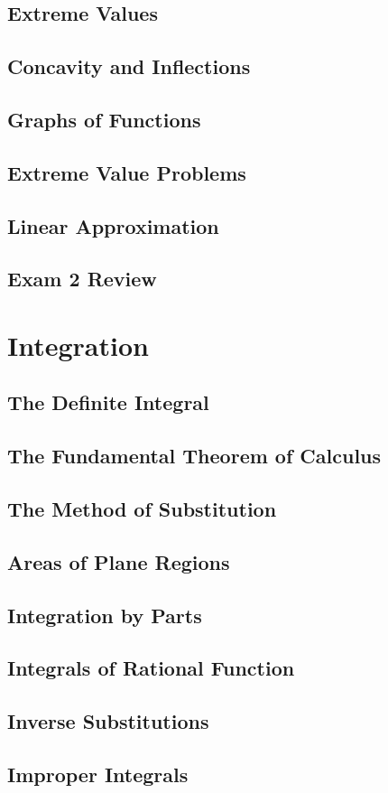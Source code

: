 \documentclass[12pt]{memoir}
\begin{document}
    \section{Extreme Values}
    
    \section{Concavity and Inflections}
    
    \section{Graphs of Functions}
    
    \section{Extreme Value Problems}
    
    \section{Linear Approximation}
    
    \section{Exam 2 Review}
    


\chapter{Integration}
    \section{The Definite Integral}
    
    \section{The Fundamental Theorem of Calculus}
    
    \section{The Method of Substitution}
    
    \section{Areas of Plane Regions}
    
    \section{Integration by Parts}
    
    \section{Integrals of Rational Function}
    
    \section{Inverse Substitutions}
    
    \section{Improper Integrals}
    
\end{document}
